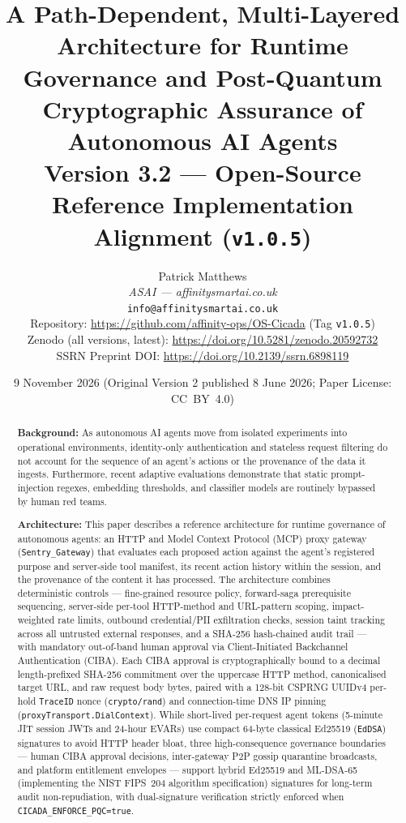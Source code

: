 \documentclass[11pt, a4paper]{article}
\title{%
    \textbf{A Path-Dependent, Multi-Layered Architecture for Runtime Governance and Post-Quantum Cryptographic Assurance of Autonomous AI Agents}\\[0.5em]
    \large Version 3.2 --- Open-Source Reference Implementation Alignment (\texttt{v1.0.5})%
}
\author{%
    Patrick Matthews\\
    \textit{ASAI --- affinitysmartai.co.uk}\\
    \texttt{info@affinitysmartai.co.uk}\\[0.3em]
    \small Repository: \url{https://github.com/affinity-ops/OS-Cicada} (Tag \texttt{v1.0.5})\\
    \small Zenodo (all versions, latest): \url{https://doi.org/10.5281/zenodo.20592732}\\
    \small SSRN Preprint DOI: \url{https://doi.org/10.2139/ssrn.6898119}%
}
\date{9 November 2026 \quad \small(Original Version 2 published 8 June 2026; Paper License: CC~BY~4.0)}
\begin{document}

\maketitle
\thispagestyle{fancy}

\begin{abstract}
\noindent\textbf{Background:} As autonomous AI agents move from isolated experiments into operational environments, identity-only authentication and stateless request filtering do not account for the sequence of an agent's actions or the provenance of the data it ingests. Furthermore, recent adaptive evaluations demonstrate that static prompt-injection regexes, embedding thresholds, and classifier models are routinely bypassed by human red teams.

\noindent\textbf{Architecture:} This paper describes a reference architecture for runtime governance of autonomous agents: an HTTP and Model Context Protocol (MCP) proxy gateway (\texttt{Sentry\_Gateway}) that evaluates each proposed action against the agent's registered purpose and server-side tool manifest, its recent action history within the session, and the provenance of the content it has processed. The architecture combines deterministic controls --- fine-grained resource policy, forward-saga prerequisite sequencing, server-side per-tool HTTP-method and URL-pattern scoping, impact-weighted rate limits, outbound credential/PII exfiltration checks, session taint tracking across all untrusted external responses, and a SHA-256 hash-chained audit trail --- with mandatory out-of-band human approval via Client-Initiated Backchannel Authentication (CIBA). Each CIBA approval is cryptographically bound to a decimal length-prefixed SHA-256 commitment over the uppercase HTTP method, canonicalised target URL, and raw request body bytes, paired with a 128-bit CSPRNG UUIDv4 per-hold \texttt{TraceID} nonce (\texttt{crypto/rand}) and connection-time DNS IP pinning (\texttt{proxyTransport.DialContext}). While short-lived per-request agent tokens (5-minute JIT session JWTs and 24-hour EVARs) use compact 64-byte classical Ed25519 (\texttt{EdDSA}) signatures to avoid HTTP header bloat, three high-consequence governance boundaries --- human CIBA approval decisions, inter-gateway P2P gossip quarantine broadcasts, and platform entitlement envelopes --- support hybrid Ed25519 and ML-DSA-65 (implementing the NIST FIPS~204 algorithm specification) signatures for long-term audit non-repudiation, with dual-signature verification strictly enforced when \texttt{CICADA\_ENFORCE\_PQC=true}.


\end{abstract}
\end{document}
